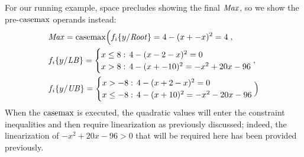 For our running example, space precludes showing the final 
$\mathit{Max}$, so we show the pre-$\mathrm{casemax}$ operands instead:
{\footnotesize 
\begin{align*}
& \Max = \casemax \Big( f_i \{ y / \Root \} = 4 - (x + -x)^2 = 4 \; , \\
& f_i \{ y / \LB \} = \begin{cases}
x \leq 8: & \sqm 4 - (x - 2 - x)^2 = 0 \\ 
x > 8:    & \sqm 4 - (x + -10)^2 = -x^2 +20x -96\\ 
\end{cases},\\
& f_i \{ y / \UB \} = \begin{cases}
x > -8:    & \sqm 4 - (x + 2 - x)^2 = 0 \\ 
x \leq -8: & \sqm 4 - (x + 10)^2 = -x^2 -20x -96\\ 
\end{cases} \Big)
\end{align*}}
When the $\mathrm{casemax}$ is executed, the quadratic values will enter the
constraint inequalities and then require linearization as previously
discussed; indeed, the linearization of $-x^2 +20x -96 > 0$ that
will be required here has been provided previously.

